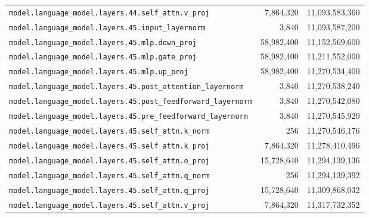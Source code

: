 \documentclass[10pt,a4paper]{article}
\theoremstyle{definition}
\begin{document}
\begin{appendices}
\begin{longtable}{p{9.5cm}rr}
\texttt{model.\allowbreak{}language\_model.\allowbreak{}layers.\allowbreak{}44.\allowbreak{}self\_attn.\allowbreak{}v\_proj} & 7,864,320 & 11,093,583,360 \\
\texttt{model.\allowbreak{}language\_model.\allowbreak{}layers.\allowbreak{}45.\allowbreak{}input\_layernorm} & 3,840 & 11,093,587,200 \\
\texttt{model.\allowbreak{}language\_model.\allowbreak{}layers.\allowbreak{}45.\allowbreak{}mlp.\allowbreak{}down\_proj} & 58,982,400 & 11,152,569,600 \\
\texttt{model.\allowbreak{}language\_model.\allowbreak{}layers.\allowbreak{}45.\allowbreak{}mlp.\allowbreak{}gate\_proj} & 58,982,400 & 11,211,552,000 \\
\texttt{model.\allowbreak{}language\_model.\allowbreak{}layers.\allowbreak{}45.\allowbreak{}mlp.\allowbreak{}up\_proj} & 58,982,400 & 11,270,534,400 \\
\texttt{model.\allowbreak{}language\_model.\allowbreak{}layers.\allowbreak{}45.\allowbreak{}post\_attention\_layernorm} & 3,840 & 11,270,538,240 \\
\texttt{model.\allowbreak{}language\_model.\allowbreak{}layers.\allowbreak{}45.\allowbreak{}post\_feedforward\_layernorm} & 3,840 & 11,270,542,080 \\
\texttt{model.\allowbreak{}language\_model.\allowbreak{}layers.\allowbreak{}45.\allowbreak{}pre\_feedforward\_layernorm} & 3,840 & 11,270,545,920 \\
\texttt{model.\allowbreak{}language\_model.\allowbreak{}layers.\allowbreak{}45.\allowbreak{}self\_attn.\allowbreak{}k\_norm} & 256 & 11,270,546,176 \\
\texttt{model.\allowbreak{}language\_model.\allowbreak{}layers.\allowbreak{}45.\allowbreak{}self\_attn.\allowbreak{}k\_proj} & 7,864,320 & 11,278,410,496 \\
\texttt{model.\allowbreak{}language\_model.\allowbreak{}layers.\allowbreak{}45.\allowbreak{}self\_attn.\allowbreak{}o\_proj} & 15,728,640 & 11,294,139,136 \\
\texttt{model.\allowbreak{}language\_model.\allowbreak{}layers.\allowbreak{}45.\allowbreak{}self\_attn.\allowbreak{}q\_norm} & 256 & 11,294,139,392 \\
\texttt{model.\allowbreak{}language\_model.\allowbreak{}layers.\allowbreak{}45.\allowbreak{}self\_attn.\allowbreak{}q\_proj} & 15,728,640 & 11,309,868,032 \\
\texttt{model.\allowbreak{}language\_model.\allowbreak{}layers.\allowbreak{}45.\allowbreak{}self\_attn.\allowbreak{}v\_proj} & 7,864,320 & 11,317,732,352 \\

\end{longtable}
\end{appendices}
\end{document}
